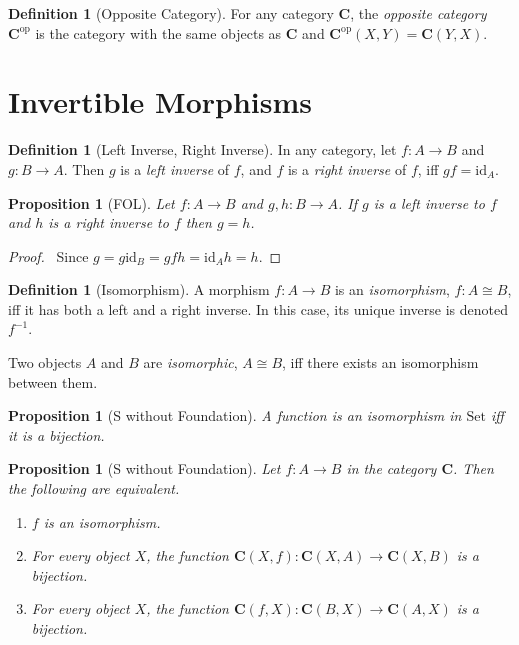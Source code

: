 \documentclass{book}
\let\qed\relax
\newtheorem{prop}[ax]{Proposition}
\theoremstyle{definition}
\newtheorem{df}[ax]{Definition}
\newcommand{\id}[1]{\ensuremath{\mathrm{id}_{#1}}}
\begin{document}
\begin{df}[Opposite Category]
For any category $\mathbf{C}$, the \emph{opposite category} $\mathbf{C}^{\mathrm{op}}$ is the category with the same objects as $\mathbf{C}$ and $\mathbf{C}^{\mathrm{op}}(X,Y) = \mathbf{C}(Y,X)$.
\end{df}

\section{Invertible Morphisms}

\begin{df}[Left Inverse, Right Inverse]
In any category, let $f : A \rightarrow B$ and $g : B \rightarrow A$. Then $g$ is a \emph{left inverse} of $f$, and $f$ is a \emph{right inverse} of $f$, iff $g f = \id{A}$.
\end{df}

\begin{prop}[FOL]
Let $f : A \rightarrow B$ and $g,h : B \rightarrow A$. If $g$ is a left inverse to $f$ and $h$ is a right inverse to $f$ then $g = h$.
\end{prop}

\begin{proof}
\pf\ Since $g = g \id{B} = gfh = \id{A} h = h$. \qed
\end{proof}

\begin{df}[Isomorphism]
A morphism $f : A \rightarrow B$ is an \emph{isomorphism}, $f : A \cong B$, iff it has both a left and a right inverse. In this case, its unique inverse is denoted $f^{-1}$.

Two objects $A$ and $B$ are \emph{isomorphic}, $A \cong B$, iff there exists an isomorphism between them.
\end{df}

\begin{prop}[S without Foundation]
A function is an isomorphism in $\mathrm{Set}$ iff it is a bijection.
\end{prop}

\begin{prop}[S without Foundation]
Let $f : A \rightarrow B$ in the category $\mathbf{C}$. Then the following are equivalent.
\begin{enumerate}
\item $f$ is an isomorphism.
\item For every object $X$, the function $\mathbf{C}(X,f) : \mathbf{C}(X,A) \rightarrow \mathbf{C}(X,B)$ is a bijection.
\item For every object $X$, the function $\mathbf{C}(f,X) : \mathbf{C}(B,X) \rightarrow \mathbf{C}(A,X)$ is a bijection.
\end{enumerate}
\end{prop}
\end{document}
